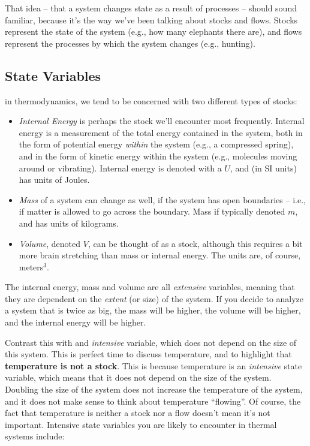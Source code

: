 That idea -- that a system changes state as a result of processes -- should sound familiar, because it's the way we've been talking about stocks and flows.  Stocks represent the state of the system (e.g., how many elephants there are), and flows represent the processes by which the system changes (e.g., hunting).  

\subsection{State Variables}

in thermodynamics, we tend to be concerned with two different types of stocks:

\begin{itemize}
\item {\it Internal Energy} is perhaps the stock we'll encounter most frequently.  Internal energy is a measurement of the total energy contained in the system, both in the form of potential energy {\it within} the system (e.g., a compressed spring), and in the form of kinetic energy within the system (e.g., molecules moving around or vibrating).  Internal energy is denoted with a $U$, and (in SI units) has units of Joules.

\item {\it Mass} of a system can change as well, if the system has open boundaries -- i.e., if matter is allowed to go across the boundary.  Mass if typically denoted $m$, and has units of kilograms.

\item{\it Volume}, denoted $V$, can be thought of as a stock, although this requires a bit more brain stretching than mass or internal energy.  The units are, of course, meters$^3$.

\end{itemize}

The internal energy, mass and volume are all {\it extensive} variables, meaning that they are dependent on the {\it extent} (or size) of the system.  If you decide to analyze a system that is twice as big, the mass will be higher, the volume will be higher, and the internal energy will be higher. 

Contrast this with and {\it intensive} variable, which does not depend on the size of this system. This is perfect time to discuss temperature, and to highlight that {\bf temperature is not a stock}. This is because temperature is an {\it intensive} state variable, which means that it does not depend on the size of the system. Doubling the size of the system does not increase the temperature of the system, and it does not make sense to think about temperature ``flowing''. Of course, the fact that temperature is neither a stock nor a flow doesn't mean it's not important.  Intensive state variables you are likely to encounter in thermal systems include:


